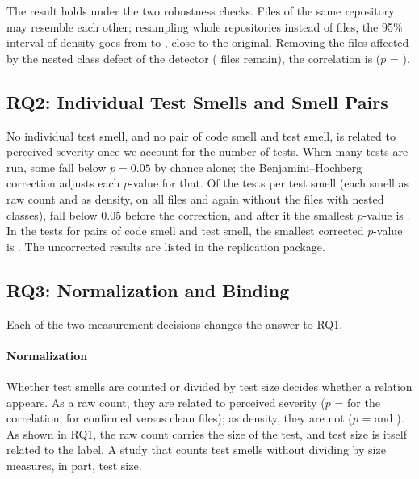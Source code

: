 The result holds under the two robustness checks. Files of the same repository may
resemble each other; resampling whole repositories instead of files, the 95\% interval of
density goes from \FbootBaixoDet{} to \FbootAltoDet{}, close to the original. Removing the
files affected by the nested class defect of the detector (\FnSemAninhadaDet{} files
remain), the correlation is \FrhoSemAninhadaDet{} ($p$ = \FpSemAninhadaDet{}).


\subsection{RQ2: Individual Test Smells and Smell Pairs}
\label{sec:res-rq2}

No individual test smell, and no pair of code smell and test smell, is related to
perceived severity once we account for the number of tests. When many tests are run, some
fall below $p = 0.05$ by chance alone; the Benjamini--Hochberg correction adjusts each
$p$-value for that. Of the \FtestesPorSmell{} tests per test smell (each smell as raw
count and as density, on all files and again without the files with nested classes),
\FnominaisPorSmell{} fall below $0.05$ before the correction, and after it the smallest $p$-value is
\FmenorPajPorSmell{}. In the \FtestesGrade{} tests for pairs of code smell and test smell,
the smallest corrected $p$-value is \FmenorPajGrade{}. The uncorrected results are listed
in the replication package.


\subsection{RQ3: Normalization and Binding}
\label{sec:res-rq3}

Each of the two measurement decisions changes the answer to RQ1.

\paragraph{Normalization}
Whether test smells are counted or divided by test size decides whether a relation
appears. As a raw count, they are related to perceived severity ($p$ = \FpBrutoDet{} for
the correlation, \FpajBrutoExtremos{} for confirmed versus clean files); as density, they
are not ($p$ = \FpDensidadeDet{} and \FpajDensidadeExtremos{}). As shown in RQ1, the raw
count carries the size of the test, and test size is itself related to the label. A study
that counts test smells without dividing by size measures, in part, test size.

